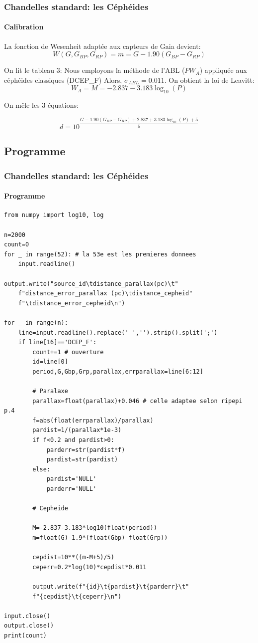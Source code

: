 \documentclass[10pt,compress,hyperref={pdfpagemode=FullScreen,colorlinks=false}]{beamer}
\begin{document}
\begin{frame}
    \frametitle{Chandelles standard: les Céphéides}
    \framesubtitle{Calibration}
    La fonction de Wesenheit adaptée aux capteurs de Gaia devient:
    \begin{equation*}\label{eq.Wesenheit}
        W(G,G_{BP},G_{RP})=m=G-1.90(G_{BP}-G_{RP})
    \end{equation*}

    On lit le tableau 3: Nous employons la méthode de l'ABL ($PW_A$) appliquée aux céphéides classiques (DCEP\_F)
    Alors, $\sigma_{ABL}=0.011$. On obtient la loi de Leavitt:
    \begin{equation*}\label{eq.leavitt-calibree}
        W_A=M=-2.837-3.183\log_{10}(P)
    \end{equation*}

    On mêle les 3 équations: %

    \[
        \boxed{ 
        d = 10^{\dfrac{G-1.90(G_{BP}-G_{RP})+2.837+3.183\log_{10}(P)+5}{5}}}
    \]
\end{frame}

\subsection{Programme}
\begin{frame}
    \frametitle{Chandelles standard: les Céphéides}
    \framesubtitle{Programme}
    \begin{lstlisting}
from numpy import log10, log

n=2000
count=0
for _ in range(52): # la 53e est les premieres donnees
    input.readline()

output.write("source_id\tdistance_parallax(pc)\t"
    f"distance_error_parallax (pc)\tdistance_cepheid"
    f"\tdistance_error_cepheid\n")

for _ in range(n):
    line=input.readline().replace(' ','').strip().split(';')
    if line[16]=='DCEP_F':
        count+=1 # ouverture
        id=line[0]
        period,G,Gbp,Grp,parallax,errparallax=line[6:12]

        # Paralaxe
        parallax=float(parallax)+0.046 # celle adaptee selon ripepi p.4
        f=abs(float(errparallax)/parallax)
        pardist=1/(parallax*1e-3) 
        if f<0.2 and pardist>0:
            parderr=str(pardist*f)
            pardist=str(pardist)
        else:
            pardist='NULL'
            parderr='NULL'

        # Cepheide

        M=-2.837-3.183*log10(float(period))
        m=float(G)-1.9*(float(Gbp)-float(Grp))

        cepdist=10**((m-M+5)/5)
        ceperr=0.2*log(10)*cepdist*0.011
        
        output.write(f"{id}\t{pardist}\t{parderr}\t"
        f"{cepdist}\t{ceperr}\n")

input.close()
output.close()
print(count)
\end{lstlisting}
\end{frame}
\end{document}
